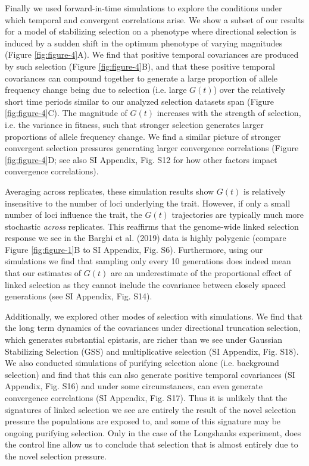 \documentclass[9pt,twocolumn,twoside]{pnas-new}
\begin{document}
Finally we used forward-in-time simulations to explore the conditions under
which temporal and convergent correlations arise. We show a subset of our
results for a model of stabilizing selection on a phenotype where directional
selection is induced by a sudden shift in the optimum phenotype of varying
magnitudes (Figure \ref{fig:figure-4}A). We find that positive temporal
covariances are produced by such selection (Figure \ref{fig:figure-4}B), and
that these positive temporal covariances can compound together to generate a
large proportion of allele frequency change being due to selection (i.e. large
$G(t)$) over the relatively short time periods similar to our analyzed
selection datasets span (Figure \ref{fig:figure-4}C).  The magnitude of $G(t)$
increases with the strength of selection, i.e. the variance in fitness, such
that stronger selection generates larger proportions of allele frequency
change.  We find a similar picture of stronger convergent selection pressures
generating larger convergence correlations (Figure \ref{fig:figure-4}D; see
also SI Appendix, Fig. S12 for how other factors impact convergence
correlations). 


Averaging across replicates, these simulation results show $G(t)$ is relatively
insensitive to the number of loci underlying the trait. However, if only a
small number of loci influence the trait, the $G(t)$ trajectories are typically
much more stochastic \emph{across} replicates. This reaffirms that the
genome-wide linked selection response we see in the Barghi et al.  (2019) data
is highly polygenic (compare Figure \ref{fig:figure-1}B to SI Appendix, Fig.
S6). Furthermore, using our simulations we find
that sampling only every 10 generations does indeed mean that our estimates of
$G(t)$ are an underestimate of the proportional effect of linked selection
as they cannot include the covariance between closely spaced generations (see
SI Appendix, Fig. S14).

Additionally, we explored other modes of selection with simulations.  We find
that the long term dynamics of the covariances under directional truncation
selection, which generates substantial epistasis, are richer than we see under
Gaussian Stabilizing Selection (GSS) and multiplicative selection (SI Appendix,
Fig. S18). We also conducted simulations of purifying selection alone (i.e.
background selection) and find that this can also generate positive temporal
covariances (SI Appendix, Fig. S16) and under some circumstances, can even
generate convergence correlations (SI Appendix, Fig. S17).  Thus it is unlikely
that the signatures of linked selection we see are entirely the result of the
novel selection pressure the populations are exposed to, and some of this
signature may be ongoing purifying selection. Only in the case of the
Longshanks experiment, does the control line allow us to conclude that
selection that is almost entirely due to the novel selection pressure.
\end{document}
